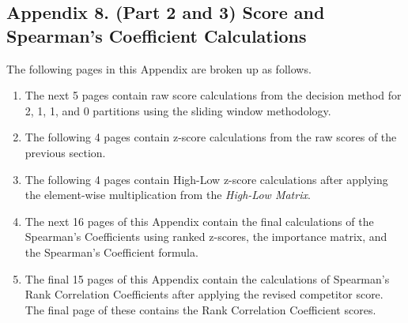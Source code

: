 \documentclass{mcmthesis}
\begin{document}
\newpage
\subsection{Appendix 8. (Part 2 and 3) Score and Spearman's Coefficient Calculations}

The following pages in this Appendix are broken up as follows.

\begin{enumerate}
    \item The next 5 pages contain raw score calculations from the decision method for 2, 1, 1, and 0 partitions using the sliding window methodology.

    \item The following 4 pages contain z-score calculations from the raw scores of the previous section. 

    \item The following 4 pages contain High-Low z-score calculations after applying the element-wise multiplication from the \textit{High-Low Matrix}.

    \item The next 16 pages of this Appendix contain the final calculations of the Spearman's Coefficients using ranked z-scores, the importance matrix, and the Spearman's Coefficient formula.

    \item The final 15 pages of this Appendix contain the calculations of Spearman's Rank Correlation Coefficients after applying the revised competitor score. The final page of these contains the Rank Correlation Coefficient scores.

\end{enumerate}










\end{document}

